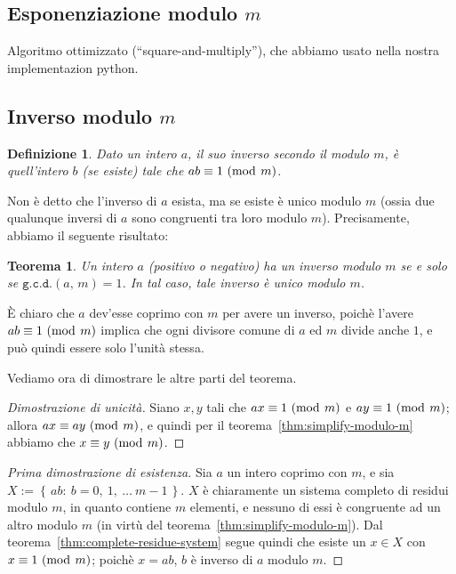 \documentclass[pdflatex,11pt,a4paper,oneside]{article}
\newcommand{\congruent}[0]{\equiv}
\newcommand{\mmodop}[0]{\ensuremath{\operatorname{mod}}}
\newcommand{\mmod}[1]{\ensuremath{\allowbreak\ (\mmodop\:{#1})}}
\newcommand{\set}[1]{\ensuremath{\left\{\,{#1}\,\right\}}}
\newcommand{\setdef}[2]{\set{{#1}:\:{#2}}}
\newcommand{\gcdop}[0]{\ensuremath{\mathtt{g.c.d.}}}
\newcommand{\xgcd}[1]{\ensuremath{\gcdop\left({#1}\right)}}
\renewcommand{\gcd}[2]{\xgcd{{#1},\,{#2}}}
\newtheorem{theorem}[TheoremLike]{Teorema}
\newtheorem{definition}[TheoremLike]{Definizione}
\begin{document}

\subsection{Esponenziazione modulo $m$}

Algoritmo ottimizzato (``square-and-multiply''), che abbiamo usato nella
nostra implementazion python.


\subsection{Inverso modulo $m$}

\begin{definition}
Dato un intero $a$, il suo inverso secondo il modulo $m$, \`e quell'intero
$b$ (se esiste) tale che $ab \congruent 1 \mmod m$.
\end{definition}

Non \`e detto che l'inverso di $a$ esista, ma se esiste \`e unico modulo $m$
(ossia due qualunque inversi di $a$ sono congruenti tra loro modulo $m$).
Precisamente, abbiamo il seguente risultato:

\begin{theorem}
Un intero $a$ (positivo o negativo) ha un inverso modulo $m$ se e solo se
$\gcd{a}{m} = 1$.  In tal caso, tale inverso \`e unico modulo $m$.
\end{theorem}

\`E chiaro che $a$ dev'esse coprimo con $m$ per avere un inverso, poich\`e
l'avere $ab \congruent 1 \mmod m$ implica che ogni divisore comune di $a$
ed $m$ divide anche $1$, e pu\`o quindi essere solo l'unit\`a stessa.

\medskip\noindent
Vediamo ora di dimostrare le altre parti del teorema.

\begin{proof}[Dimostrazione di unicit\`a]
Siano $x, y$ tali che $ax \congruent 1 \mmod m$ e $ay \congruent 1
\mmod m$; allora $ax \congruent ay \mmod m$, e quindi per il
teorema~\eqref{thm:simplify-modulo-m} abbiamo che $x \congruent y
\mmod m$.
\end{proof}

\begin{proof}[Prima dimostrazione di esistenza]
Sia $a$ un intero coprimo con $m$, e sia $X := \setdef{ab}{b = 0,\: 1,\:
\ldots\: m - 1}$. $X$ \`e chiaramente un sistema completo di residui modulo
$m$, in quanto contiene $m$ elementi, e nessuno di essi \`e congruente ad
un altro modulo $m$ (in virt\`u del teorema~\eqref{thm:simplify-modulo-m}).
Dal teorema~\eqref{thm:complete-residue-system} segue quindi che esiste un
$x \in X$ con $x \congruent 1 \mmod m$; poich\`e $x = ab$, $b$ \`e inverso
di $a$ modulo $m$.
\end{proof}
\end{document}
